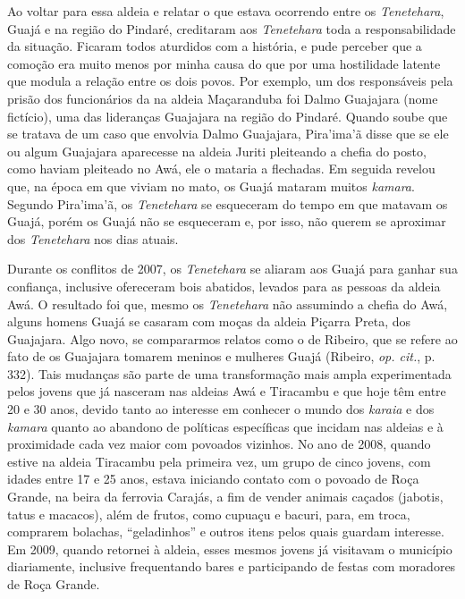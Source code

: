 Ao voltar para essa aldeia e relatar o que estava ocorrendo entre os
\emph{Tenetehara}, Guajá e  na região do Pindaré, creditaram aos
\emph{Tenetehara} toda a responsabilidade da situação. Ficaram todos
aturdidos com a história, e pude perceber que a comoção era muito menos
por minha causa do que por uma hostilidade latente que modula a relação
entre os dois povos. Por exemplo, um dos responsáveis pela prisão dos
funcionários da  na aldeia Maçaranduba foi Dalmo Guajajara (nome
fictício), uma das lideranças Guajajara na região do Pindaré. Quando
soube que se tratava de um caso que envolvia Dalmo Guajajara, Pira'ima'ã
disse que se ele ou algum Guajajara aparecesse na aldeia Juriti
pleiteando a chefia do posto, como haviam pleiteado no  Awá, ele o
mataria a flechadas. Em seguida revelou que, na época em que viviam no
mato, os Guajá mataram muitos \emph{kamara}. Segundo Pira'ima'ã, os
\emph{Tenetehara} se esqueceram do tempo em que matavam os Guajá, porém
os Guajá não se esqueceram e, por isso, não querem se aproximar dos
\emph{Tenetehara} nos dias atuais.

Durante os conflitos de 2007, os \emph{Tenetehara} se aliaram aos Guajá
para ganhar sua confiança, inclusive ofereceram bois abatidos, levados
para as pessoas da aldeia Awá. O resultado foi que, mesmo os
\emph{Tenetehara} não assumindo a chefia do  Awá, alguns homens Guajá
se casaram com moças da aldeia Piçarra Preta, dos Guajajara. Algo novo,
se compararmos relatos como o de Ribeiro, que se refere ao fato de os
Guajajara tomarem meninos e mulheres Guajá (Ribeiro, \emph{op. cit.}, p. 332).
Tais mudanças são parte de uma transformação mais ampla experimentada
pelos jovens que já nasceram nas aldeias Awá e Tiracambu e que hoje
têm entre 20 e 30 anos, devido tanto ao interesse em conhecer o mundo
dos \emph{karaia} e dos \emph{kamara} quanto ao abandono de políticas
específicas que incidam nas aldeias e à proximidade cada vez maior com
povoados vizinhos. No ano de 2008, quando estive na aldeia Tiracambu
pela primeira vez, um grupo de cinco jovens, com idades entre 17 e 25
anos, estava iniciando contato com o povoado de Roça Grande, na beira da
ferrovia Carajás, a fim de vender animais caçados (jabotis, tatus e
macacos), além de frutos, como cupuaçu e bacuri, para, em troca,
comprarem bolachas, ``geladinhos'' e outros itens pelos quais guardam
interesse. Em 2009, quando retornei à aldeia, esses mesmos jovens já
visitavam o município diariamente, inclusive frequentando bares e
participando de festas com moradores de Roça Grande.

